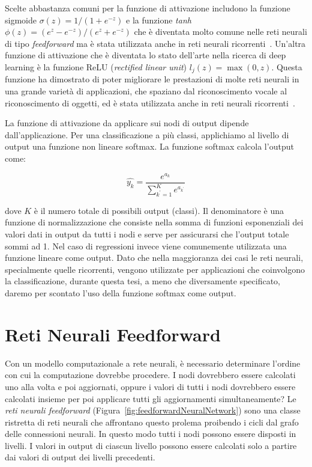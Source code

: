 Scelte abbastanza comuni per la funzione di attivazione includono la funzione
sigmoide $\sigma(z) = 1/(1+e^{-z})$ e la funzione \emph{tanh}
$\phi(z)=(e^z-e^{-z})/(e^z+e^{-z})$ che \`e diventata molto comune nelle reti
neurali di tipo \emph{feedforward} ma \`e stata utilizzata anche in reti neurali
ricorrenti~\cite{Sutskever:2011}. Un'altra funzione di attivazione che \`e
diventata lo stato dell'arte nella ricerca di deep learning \`e la funzione
ReLU (\emph{rectified linear unit}) $l_j(z)=\operatorname{max}(0, z)$. Questa
funzione ha dimostrato di poter migliorare le prestazioni di molte reti neurali
in una grande variet\`a di applicazioni, che spaziano dal riconoscimento vocale
al riconoscimento di oggetti, ed \`e stata utilizzata anche in reti neurali
ricorrenti~\cite{Bengio:2013}.

La funzione di attivazione da applicare sui nodi di output dipende dall'applicazione.
Per una classificazione a pi\`u classi, applichiamo al livello di output una
funzione non lineare softmax. La funzione softmax calcola l'output come:

\begin{equation}
  \hat{y_k} = \frac{e^{a_k}}{\sum_{k^{'}=1}^{K} e^{a_{k^{'}}}}
\end{equation}

dove $K$ \`e il numero totale di possibili output (classi). Il denominatore \`e
una funzione di normalizzazione che consiste nella somma di funzioni esponenziali
dei valori dati in output da tutti i nodi e serve per assicurarsi che l'output
totale sommi ad 1. Nel caso di regressioni invece viene comunemente utilizzata
una funzione lineare come output. Dato che nella maggioranza dei casi le reti
neurali, specialmente quelle ricorrenti, vengono utilizzate per applicazioni che
coinvolgono la classificazione, durante questa tesi, a meno che diversamente
specificato, daremo per scontato l'uso della funzione softmax come output.

\section{Reti Neurali Feedforward}

Con un modello computazionale a rete neurali, \`e necessario determinare
l'ordine con cui la computazione dovrebbe procedere. I nodi dovrebbero essere
calcolati uno alla volta e poi aggiornati, oppure i valori di tutti i nodi
dovrebbero essere calcolati insieme per poi applicare tutti gli aggiornamenti
simultaneamente? Le \emph{reti neurali feedforward}
(Figura~\ref{fig:feedforwardNeuralNetwork}) sono una classe ristretta di reti
neurali che affrontano questo prolema proibendo i cicli dal grafo delle
connessioni neurali. In questo modo tutti i nodi possono essere disposti in
livelli. I valori in output di ciascun livello possono essere calcolati solo a
partire dai valori di output dei livelli precedenti.

